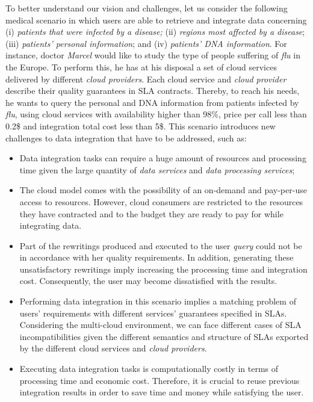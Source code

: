 To better understand our vision and challenges, let us consider the following medical scenario in which users are able to retrieve and integrate data concerning (i) \textit{patients that were infected by a disease;}
(ii) \textit{regions most affected by a disease}; (iii) \textit{patients' personal information}; and (iv) \textit{patients' DNA information}. For instance, doctor \textit{Marcel} would like to study the type of people suffering of \textit{flu} in the Europe. To perform this, he has at his disposal a set of cloud services delivered by different \textit{cloud providers}.
Each cloud service and \textit{cloud provider} describe their quality guarantees in SLA contracts. Thereby, to reach his needs, he wants to query the personal and DNA information from patients infected by \textit{flu}, using cloud services with availability higher than 98\%, price per call less than 0.2\$ and integration total cost less than 5\$. This scenario introduces new challenges to data integration that have to be addressed, such as:
\begin{itemize}
\item Data integration tasks can require a huge amount of resources and processing time given the large quantity of \textit{data services} and \textit{data processing services};
\item The cloud model comes with the possibility of an on-demand and pay-per-use access to resources. However, cloud consumers are restricted to the resources they have contracted and to the budget they are ready to pay for while integrating data.
\item Part of the rewritings produced and executed to the user \textit{query} could not be in accordance with her quality requirements. In addition, generating these unsatisfactory rewritings imply increasing  the processing time and integration cost. Consequently, the user may become dissatisfied with the results. 
\item Performing data integration in this scenario implies a matching problem of users' requirements with different services' guarantees specified in SLAs. Considering the multi-cloud environment, we can face different cases of SLA incompatibilities given the different semantics and structure of SLAs exported by the different cloud services and \textit{cloud providers}.
\item Executing data integration tasks is computationally costly in terms of processing time and economic cost. Therefore, it is crucial to reuse previous integration results in order to save time and money while satisfying the user.
\end{itemize}


